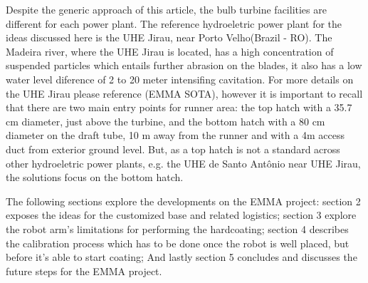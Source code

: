 Despite the generic approach of this article, the bulb turbine facilities are
different for each power plant. The reference hydroeletric power plant for the
ideas discussed here is the UHE Jirau, near Porto Velho(Brazil - RO). The
Madeira river, where the UHE Jirau is located, has a high concentration of
suspended particles which entails further abrasion on the blades, it also has a
low water level diference of 2 to 20 meter intensifing cavitation. For more
details on the UHE Jirau please reference (EMMA SOTA), however it is important
to recall that there are two main entry points for runner area: the top hatch
with a 35.7 cm diameter, just above the turbine, and the bottom hatch with a 80
cm diameter on the draft tube, 10 m away from the runner and with a 4m access
duct from exterior ground level. But, as a top hatch is not a standard across
other hydroeletric power plants, e.g. the UHE de Santo Antônio near UHE Jirau,
the solutions focus on the bottom hatch.

The following sections explore the developments on the EMMA project: 
section 2 exposes the ideas for the customized base and related logistics;
section 3 explore the robot arm's limitations for performing the hardcoating;
section 4 describes the calibration process which has to be done once the robot
is well placed, but before it's able to start coating; And lastly section 5
concludes and discusses the future steps for the EMMA project.


% 

